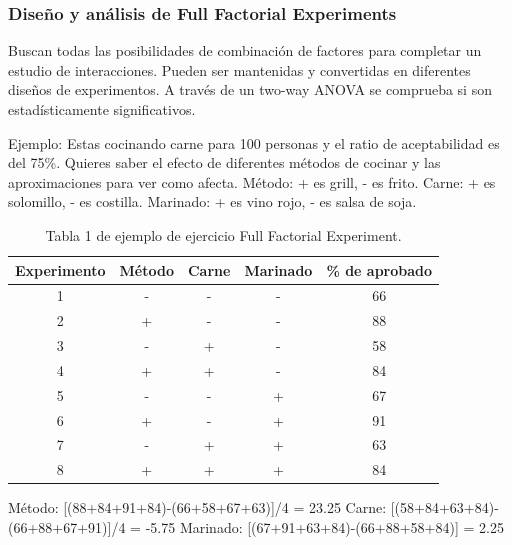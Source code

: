 \documentclass[]{article}
\begin{document}
\subsubsection{Diseño y análisis de Full Factorial Experiments}
Buscan todas las posibilidades de combinación de factores para completar un estudio de interacciones. Pueden ser mantenidas y convertidas en diferentes diseños de experimentos. A través de un two-way ANOVA se comprueba si son estadísticamente significativos.

Ejemplo: Estas cocinando carne para 100 personas y el ratio de aceptabilidad es del 75\%. Quieres saber el efecto de diferentes métodos de cocinar y las aproximaciones para ver como afecta.
Método: + es grill, - es frito. Carne: + es solomillo, - es costilla. Marinado: + es vino rojo, - es salsa de soja.

\begin{table}[H]
	\begin{center}
\begin{tabular}{|c|c|c|c|c|}
	\hline Experimento & Método & Carne & Marinado & \% de aprobado \\ 
	\hline 1 & - & - & - & 66 \\ 
	\hline 2 & + & - & - & 88 \\ 
	\hline 3 & - & + & - & 58 \\ 
	\hline 4 & + & + & - & 84 \\ 
	\hline 5 & - & - & + & 67 \\ 
	\hline 6 & + & - & + & 91 \\ 
	\hline 7 & - & + & + & 63 \\ 
	\hline 8 & + & + & + & 84 \\ 
	\hline 
\end{tabular} 
		\caption{Tabla 1 de ejemplo de ejercicio Full Factorial Experiment.}
		\end{center}
\end{table}

Método: [(88+84+91+84)-(66+58+67+63)]/4 = 23.25 \newline
Carne: [(58+84+63+84)-(66+88+67+91)]/4 = -5.75 \newline
Marinado: [(67+91+63+84)-(66+88+58+84)] = 2.25
\end{document}
